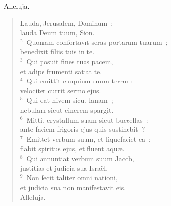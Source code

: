 ~\lettrine[lines=10,image=true,loversize=0.05,lraise=-0.03]{A}{}lleluja. \begin{flushleft}\begin{verse}\vspace{6pt}Lauda, Jerusalem, Dominum~;\\ lauda Deum tuum, Sion.\\
${}^{2}$~Quoniam confortavit seras portarum tuarum~;\\ benedixit filiis tuis in te.\\
${}^{3}$~Qui posuit fines tuos pacem,\\ et adipe frumenti satiat te.\\
${}^{4}$~Qui emittit eloquium suum terr\ae~:\\ velociter currit sermo ejus.\\
${}^{5}$~Qui dat nivem sicut lanam~;\\ nebulam sicut cinerem spargit.\\
${}^{6}$~Mittit crystallum suam sicut buccellas~:\\ ante faciem frigoris ejus quis sustinebit~?\\
${}^{7}$~Emittet verbum suum, et liquefaciet ea~;\\ flabit spiritus ejus, et fluent aqu\ae .\\
${}^{8}$~Qui annuntiat verbum suum Jacob,\\ justitias et judicia sua Isra\"el.\\
${}^{9}$~Non fecit taliter omni nationi,\\ et judicia sua non manifestavit eis.\\ Alleluja.\end{verse}\end{flushleft}


